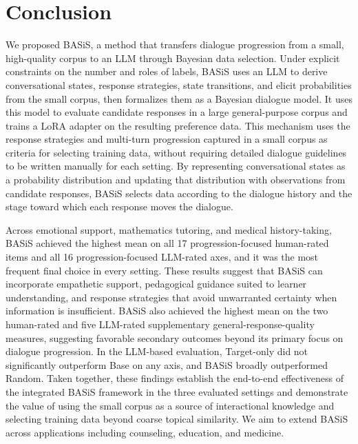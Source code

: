\documentclass[manuscript,review,anonymous]{acmart}
\begin{document}
\section{Conclusion}
\label{sec:conclusion}

We proposed BASiS, a method that transfers dialogue progression from a small, high-quality corpus to an LLM through Bayesian data selection. Under explicit constraints on the number and roles of labels, BASiS uses an LLM to derive conversational states, response strategies, state transitions, and elicit probabilities from the small corpus, then formalizes them as a Bayesian dialogue model. It uses this model to evaluate candidate responses in a large general-purpose corpus and trains a LoRA adapter on the resulting preference data.
This mechanism uses the response strategies and multi-turn progression captured in a small corpus as criteria for selecting training data, without requiring detailed dialogue guidelines to be written manually for each setting. By representing conversational states as a probability distribution and updating that distribution with observations from candidate responses, BASiS selects data according to the dialogue history and the stage toward which each response moves the dialogue.

Across emotional support, mathematics tutoring, and medical history-taking, BASiS achieved the highest mean on all 17 progression-focused human-rated items and all 16 progression-focused LLM-rated axes, and it was the most frequent final choice in every setting. These results suggest that BASiS can incorporate empathetic support, pedagogical guidance suited to learner understanding, and response strategies that avoid unwarranted certainty when information is insufficient. BASiS also achieved the highest mean on the two human-rated and five LLM-rated supplementary general-response-quality measures, suggesting favorable secondary outcomes beyond its primary focus on dialogue progression. In the LLM-based evaluation, Target-only did not significantly outperform Base on any axis, and BASiS broadly outperformed Random. Taken together, these findings establish the end-to-end effectiveness of the integrated BASiS framework in the three evaluated settings and demonstrate the value of using the small corpus as a source of interactional knowledge and selecting training data beyond coarse topical similarity. We aim to extend BASiS across applications including counseling, education, and medicine.





\clearpage
\appendix

\end{document}
